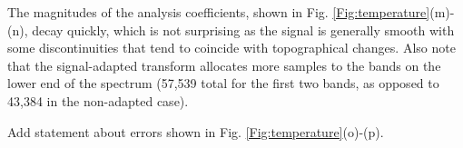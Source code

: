 \documentclass[journal, 10pt]{IEEEtran}
\begin{document}
The magnitudes of the analysis coefficients, shown in Fig. \ref{Fig:temperature}(m)-(n), decay quickly, which is not surprising as the signal is generally smooth with some discontinuities that tend to coincide with topographical changes. Also note that the signal-adapted transform allocates more samples to the bands on the lower end of the spectrum (57,539 total for the first two bands, as opposed to 43,384 in the non-adapted case).

{\color{blue} 
Add statement about errors shown in Fig. \ref{Fig:temperature}(o)-(p).}


\end{document}
